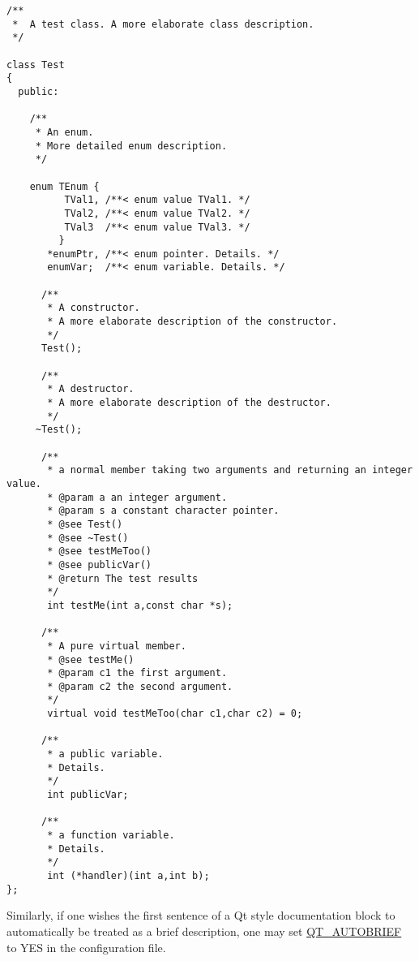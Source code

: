 \begin{DocInclude}\begin{verbatim}/**
 *  A test class. A more elaborate class description.
 */

class Test
{
  public:

    /** 
     * An enum.
     * More detailed enum description.
     */

    enum TEnum { 
          TVal1, /**< enum value TVal1. */  
          TVal2, /**< enum value TVal2. */  
          TVal3  /**< enum value TVal3. */  
         } 
       *enumPtr, /**< enum pointer. Details. */
       enumVar;  /**< enum variable. Details. */
       
      /**
       * A constructor.
       * A more elaborate description of the constructor.
       */
      Test();

      /**
       * A destructor.
       * A more elaborate description of the destructor.
       */
     ~Test();
    
      /**
       * a normal member taking two arguments and returning an integer value.
       * @param a an integer argument.
       * @param s a constant character pointer.
       * @see Test()
       * @see ~Test()
       * @see testMeToo()
       * @see publicVar()
       * @return The test results
       */
       int testMe(int a,const char *s);
       
      /**
       * A pure virtual member.
       * @see testMe()
       * @param c1 the first argument.
       * @param c2 the second argument.
       */
       virtual void testMeToo(char c1,char c2) = 0;
   
      /** 
       * a public variable.
       * Details.
       */
       int publicVar;
       
      /**
       * a function variable.
       * Details.
       */
       int (*handler)(int a,int b);
};

\end{verbatim}
\end{DocInclude}
 

Similarly, if one wishes the first sentence of a Qt style documentation block to automatically be treated as a brief description, one may set \hyperlink{config_cfg_qt_autobrief}{QT\_\-AUTOBRIEF} to YES in the configuration file.

